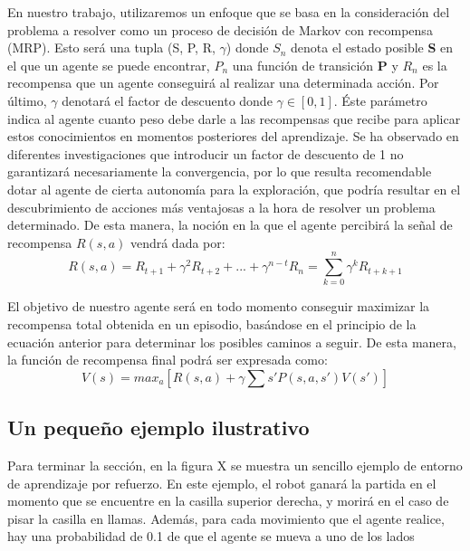 \documentclass[11pt,spanish,listoffigures,listoftables]{tfgetsinf}
\begin{document}
En nuestro trabajo, utilizaremos un enfoque que se basa en la consideración del problema a resolver como un proceso de decisión de Markov con recompensa (MRP). Esto será una tupla (S, P, R, $\gamma$) donde $S_{n}$ denota el estado posible \textbf{S}  en el que un agente se puede encontrar, $P_{n}$ una función de transición \textbf{P} y $R_{n}$ es la recompensa que un agente conseguirá al realizar una determinada acción. Por último, $\gamma$ denotará el factor de descuento donde $\gamma \in [0,1]$. Éste parámetro indica al agente cuanto peso debe darle a las recompensas que recibe para aplicar estos conocimientos en momentos posteriores del aprendizaje. Se ha observado en diferentes investigaciones que introducir un factor de descuento de 1 no garantizará necesariamente la convergencia, por lo que resulta recomendable dotar al agente de cierta autonomía para la exploración, que podría resultar en el descubrimiento de acciones más ventajosas a la hora de resolver un problema determinado. De esta manera, la noción en la que el agente percibirá la señal de recompensa \textbf{$R(s,a)$} vendrá dada por:
\[R(s,a) = R_{t+1} + \gamma^{2}R_{t+2} + ... + \gamma^{n-t}R_{n} = \displaystyle\sum_{k=0}^{n} \gamma^{k} R_{t+k+1} \]

El objetivo de nuestro agente será en todo momento conseguir maximizar la recompensa total obtenida en un episodio, basándose en el principio de la ecuación anterior para determinar los posibles caminos a seguir. De esta manera, la función de recompensa final podrá ser expresada como:  \[V(s) = max_{a}[R(s,a) + \gamma \sum{s'}P(s,a,s') V(s')]\]



\subsection{Un pequeño ejemplo ilustrativo}

Para terminar la sección, en la figura X se muestra un sencillo ejemplo de entorno de aprendizaje por refuerzo. En este ejemplo, el robot ganará la partida en el momento que se encuentre en la casilla superior derecha, y morirá en el caso de pisar la casilla en llamas. Además, para cada movimiento que el agente realice, hay una probabilidad de 0.1 de que el agente se mueva a uno de los lados
\end{document}
